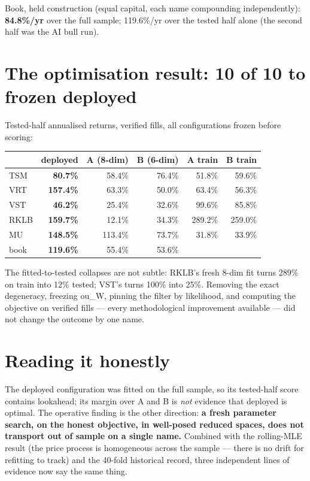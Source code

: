 \documentclass[11pt,a4paper]{article}
\begin{document}
Book, held construction (equal capital, each name compounding independently):
\textbf{84.8\%/yr} over the full sample; 119.6\%/yr over the tested half alone
(the second half was the AI bull run).

\section*{The optimisation result: 10 of 10 to frozen deployed}

Tested-half annualised returns, verified fills, all configurations frozen before
scoring:

\begin{center}
\begin{tabular}{lrrr|rr}
\toprule
 & deployed & A (8-dim) & B (6-dim) & A train & B train \\
\midrule
TSM  & \textbf{80.7\%} & 58.4\% & 76.4\% & 51.8\% & 59.6\% \\
VRT  & \textbf{157.4\%} & 63.3\% & 50.0\% & 63.4\% & 56.3\% \\
VST  & \textbf{46.2\%} & 25.4\% & 32.6\% & 99.6\% & 85.8\% \\
RKLB & \textbf{159.7\%} & 12.1\% & 34.3\% & 289.2\% & 259.0\% \\
MU   & \textbf{148.5\%} & 113.4\% & 73.7\% & 31.8\% & 33.9\% \\
\midrule
book & \textbf{119.6\%} & 55.4\% & 53.6\% & & \\
\bottomrule
\end{tabular}
\end{center}

The fitted-to-tested collapses are not subtle: RKLB's fresh 8-dim fit turns 289\%
on train into 12\% tested; VST's turns 100\% into 25\%. Removing the exact
degeneracy, freezing ou\_W, pinning the filter by likelihood, and computing the
objective on verified fills --- every methodological improvement available --- did
not change the outcome by one name.

\section*{Reading it honestly}

The deployed configuration was fitted on the full sample, so its tested-half score
contains lookahead; its margin over A and B is \emph{not} evidence that deployed is
optimal. The operative finding is the other direction: \textbf{a fresh parameter
search, on the honest objective, in well-posed reduced spaces, does not transport
out of sample on a single name.} Combined with the rolling-MLE result (the price
process is homogeneous across the sample --- there is no drift for refitting to
track) and the 40-fold historical record, three independent lines of evidence now
say the same thing.
\end{document}
